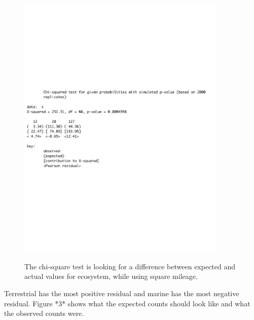 \documentclass[12pt, letterpaper]{article}
\begin{document}
\begin{figure}[h]
\begin{center}
	\includegraphics[width=10cm]{chi-eco-2.pdf}
	\label{fig: Chi-Square Test: Ecosystem}
	\caption{The chi-square test is looking for a difference between expected and actual values for ecosystem, while using square mileage.}
\end{center}
\end{figure}

Terrestrial has the most positive residual and marine has the most negative residual. Figure *3* shows what the expected counts should look like and what the observed counts were. 
\end{document}
